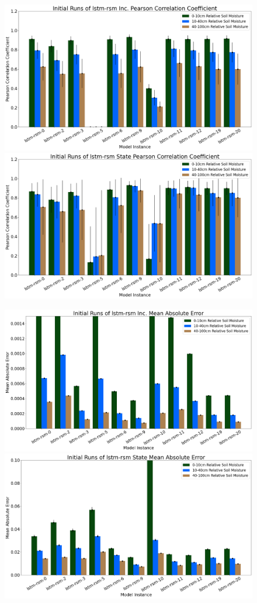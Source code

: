 \begin{figure}[hp!]
    \centering
    \includegraphics[width=.48\linewidth,draft=false]{figures/efficiency_initial-best/eval_test_efficiency_initial-lstm-rsm_cc_res.png}
    \includegraphics[width=.48\linewidth,draft=false]{figures/efficiency_initial-best/eval_test_efficiency_initial-lstm-rsm_cc_state.png}

    \includegraphics[width=.48\linewidth,draft=false]{figures/efficiency_initial-best/eval_test_efficiency_initial-lstm-rsm_mae_res.png}
    \includegraphics[width=.48\linewidth,draft=false]{figures/efficiency_initial-best/eval_test_efficiency_initial-lstm-rsm_mae_state.png}


\end{figure}
